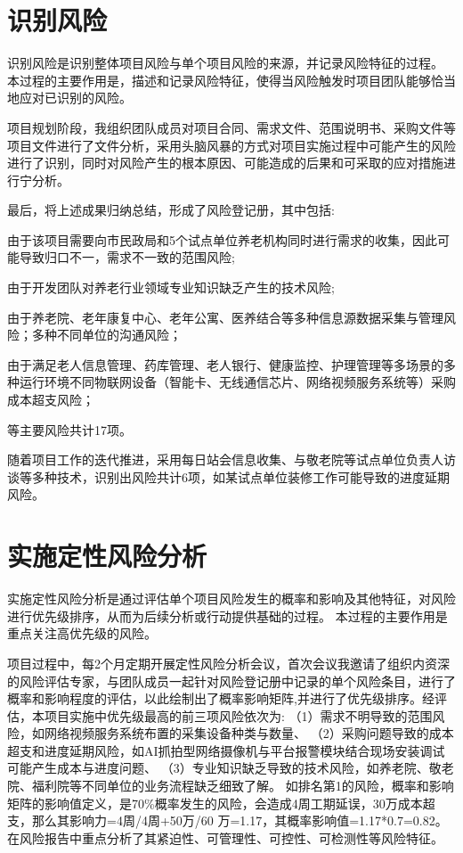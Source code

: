 \documentclass[UTF8]{../computerUniverse}
\begin{document}
\section{识别风险}
识别风险是识别整体项目风险与单个项目风险的来源，并记录风险特征的过程。
本过程的主要作用是，描述和记录风险特征，使得当风险触发时项目团队能够恰当地应对已识别的风险。

项目规划阶段，我组织团队成员对项目合同、需求文件、范围说明书、采购文件等项目文件进行了文件分析，采用头脑风暴的方式对项目实施过程中可能产生的风险进行了识别，同时对风险产生的根本原因、可能造成的后果和可采取的应对措施进行宁分析。

最后，将上述成果归纳总结，形成了风险登记册，其中包括:

由于该项目需要向市民政局和5个试点单位养老机构同时进行需求的收集，因此可能导致归口不一，需求不一致的范围风险;

由于开发团队对养老行业领域专业知识缺乏产生的技术风险;

由于养老院、老年康复中心、老年公寓、医养结合等多种信息源数据采集与管理风险；多种不同单位的沟通风险；

由于满足老人信息管理、药库管理、老人银行、健康监控、护理管理等多场景的多种运行环境不同物联网设备（智能卡、无线通信芯片、网络视频服务系统等）采购成本超支风险；

等主要风险共计17项。

随着项目工作的迭代推进，采用每日站会信息收集、与敬老院等试点单位负责人访谈等多种技术，识别出风险共计6项，如某试点单位装修工作可能导致的进度延期风险。




\section{实施定性风险分析}

实施定性风险分析是通过评估单个项目风险发生的概率和影响及其他特征，对风险进行优先级排序，从而为后续分析或行动提供基础的过程。
本过程的主要作用是重点关注高优先级的风险。

项目过程中，每2个月定期开展定性风险分析会议，首次会议我邀请了组织内资深的风险评估专家，与团队成员一起针对风险登记册中记录的单个风险条目，进行了概率和影响程度的评估，以此绘制出了概率影响矩阵,并进行了优先级排序。经评估，本项目实施中优先级最高的前三项风险依次为:
（1）需求不明导致的范围风险，如网络视频服务系统布置的采集设备种类与数量、
（2）采购问题导致的成本超支和进度延期风险，如AI抓拍型网络摄像机与平台报警模块结合现场安装调试可能产生成本与进度问题、
（3）专业知识缺乏导致的技术风险，如养老院、敬老院、福利院等不同单位的业务流程缺乏细致了解。
如排名第1的风险，概率和影响矩阵的影响值定义，是70\%概率发生的风险，会造成4周工期延误，30万成本超支，那么其影响力=4周/4周+50万/60 万=1.17，其概率影响值=1.17*0.7=0.82。在风险报告中重点分析了其紧迫性、可管理性、可控性、可检测性等风险特征。
\end{document}
